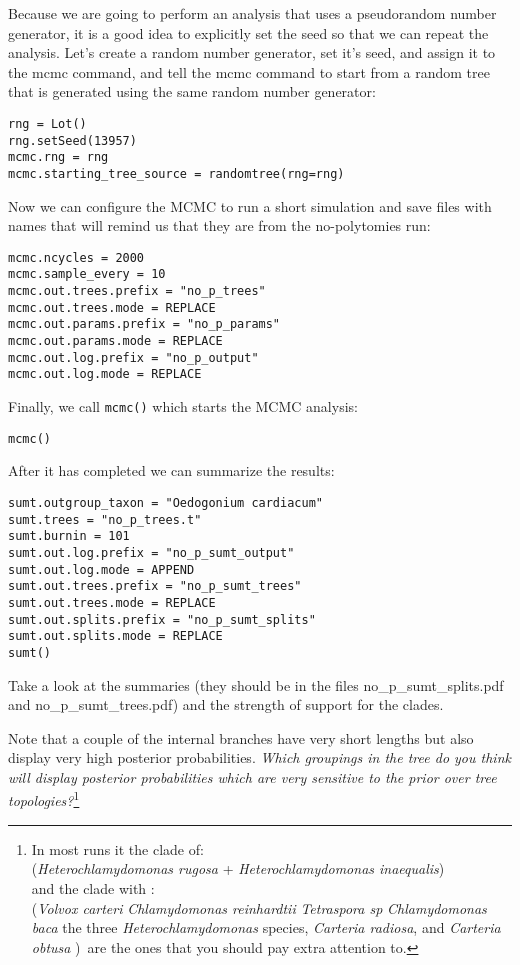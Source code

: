 \documentclass{article}
\newcommand{\cmd}[1]{\texttt{#1}\xspace}
\newcommand{\localfile}[1]{\textsf{#1}\xspace}
\newcommand{\QandA}[2]{\textit{#1}\footnote{#2}\xspace}
\begin{document}
Because we are going to perform an analysis that uses a pseudorandom number generator, it is a 
good idea to explicitly set the seed so that we can repeat the analysis.
Let's create a random number generator, set it's seed, and assign it to the mcmc command, and 
tell the mcmc command to start from a random tree that is generated using the same random
number generator:

\begin{verbatim}
rng = Lot()
rng.setSeed(13957)
mcmc.rng = rng
mcmc.starting_tree_source = randomtree(rng=rng)
\end{verbatim}

Now we can configure the MCMC to run a short simulation and save files with names that
will remind us that they are from the no-polytomies run:
\begin{verbatim}
mcmc.ncycles = 2000
mcmc.sample_every = 10
mcmc.out.trees.prefix = "no_p_trees"
mcmc.out.trees.mode = REPLACE
mcmc.out.params.prefix = "no_p_params"
mcmc.out.params.mode = REPLACE
mcmc.out.log.prefix = "no_p_output"
mcmc.out.log.mode = REPLACE
\end{verbatim}

Finally, we call \cmd{mcmc()} which starts the MCMC analysis:
\begin{verbatim}
mcmc()
\end{verbatim}

After it has completed we can summarize the results:

\begin{verbatim}
sumt.outgroup_taxon = "Oedogonium cardiacum"
sumt.trees = "no_p_trees.t"
sumt.burnin = 101
sumt.out.log.prefix = "no_p_sumt_output"
sumt.out.log.mode = APPEND
sumt.out.trees.prefix = "no_p_sumt_trees"
sumt.out.trees.mode = REPLACE
sumt.out.splits.prefix = "no_p_sumt_splits"
sumt.out.splits.mode = REPLACE
sumt()
\end{verbatim}
Take a look at the summaries (they should be in the files \localfile{no\_p\_sumt\_splits.pdf} and \localfile{no\_p\_sumt\_trees.pdf}) and  the strength of support for the clades.

Note that a couple of the internal branches have very short lengths but 
also display very high posterior probabilities.  
\QandA{Which groupings in the tree do you think will display posterior probabilities
which are very sensitive to the prior over tree topologies?}{In most runs it the clade of:\\ ({\em Heterochlamydomonas rugosa} + {\em Heterochlamydomonas inaequalis})\\ 
and the clade with :\\ 
({\em Volvox carteri}
{\em Chlamydomonas reinhardtii }
{\em Tetraspora sp }
{\em Chlamydomonas baca}
the three {\em Heterochlamydomonas} species,
{\em Carteria radiosa}, and {\em Carteria obtusa }
)\
are the ones that you should pay extra attention to.}
\end{document}
